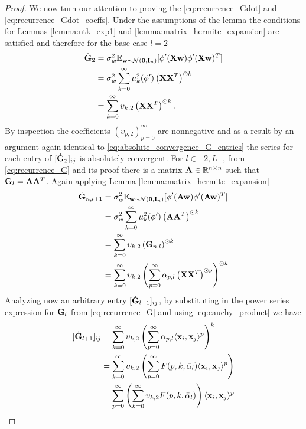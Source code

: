 \begin{proof}
    We now turn our attention to proving the \eqref{eq:recurrence_Gdot} and \eqref{eq:recurrence_Gdot_coeffs}.  Under the assumptions of the lemma the conditions for Lemmas \ref{lemma:ntk_exp1} and \ref{lemma:matrix_hermite_expansion} are satisfied and therefore for the base case $l=2$ 
    \[
    \begin{aligned}
        \dot{\mathbf{G}}_{2} &= \sigma_w^2 \mathbb{E}_{\mathbf w \sim \mathcal{N}(\textbf{0}, \textbf{I}_n)}[\phi'(\mathbf{X} \mathbf w) \phi'(\mathbf{X} \mathbf w)^T]\\
        &= \sigma_w^2 \sum_{k=0}^\infty \mu_k^2(\phi') \left(\mathbf{X} \mathbf{X}^T \right)^{\odot k}\\
        & = \sum_{k=0}^\infty \upsilon_{k,2} \left(\mathbf{X} \mathbf{X}^T \right)^{\odot k}. 
    \end{aligned}
    \]
    By inspection the coefficients $(\upsilon_{p,2})_{p=0}^{\infty}$ are nonnegative and as a result by an argument again identical to \eqref{eq:absolute_convergence_G_entries} the series for each entry of $[\dot{\mathbf{G}}_{2}]_{ij}$ is absolutely convergent. For $l \in [2,L]$, from \eqref{eq:recurrence_G} and its proof there is a matrix $\mathbf{A} \in \mathbb{R}^{n \times n}$ such that $\mathbf{G}_{l} = \mathbf{A} \mathbf{A}^T$. Again applying Lemma \ref{lemma:matrix_hermite_expansion}
    \[
    \begin{aligned}
    \dot{\mathbf{G}}_{n,l+1}
    & = \sigma_w^2 \mathbb{E}_{\mathbf w \sim \mathcal{N}(\textbf{0}, \textbf{I}_n)}[\phi'(\mathbf{A} \mathbf w) \phi'(\mathbf{A} \mathbf w)^T]\\
    & = \sigma_w^2 \sum_{k=0}^\infty \mu_k^2(\phi') \left(\mathbf{A} \mathbf{A}^T \right)^{\odot k}\\
    & = \sum_{k=0}^\infty \upsilon_{k,2}\left(\mathbf{G}_{n,l}\right)^{\odot k}\\
    & = \sum_{k=0}^\infty \upsilon_{k,2}\left(\sum_{p=0}^{\infty} \alpha_{p, l} \left( \mathbf{X} \mathbf{X}^T\right)^{\odot p}\right)^{\odot k}
    \end{aligned}
    \]
    Analyzing now an arbitrary entry $[\dot{\mathbf{G}}_{l+1}]_{ij}$, by substituting in the power series expression for $\mathbf{G}_{l}$ from \eqref{eq:recurrence_G} and using \eqref{eq:cauchy_product} we have
    \[
    \begin{aligned}
        [\dot{\mG}_{l+1}]_{ij} &= \sum_{k=0}^\infty \upsilon_{k,2} \left(\sum_{p=0}^{\infty} \alpha_{p, l}  \langle \vx_i, \vx_j \rangle^p \right)^k\\
        & = \sum_{k=0}^\infty \upsilon_{k,2} \left(\sum_{p=0}^{\infty} F(p,k,\bar{\alpha}_{l}) \langle \vx_i, \vx_j \rangle^p \right)\\
        & = \sum_{p=0}^{\infty} \left(\sum_{k=0}^\infty\upsilon_{k,2} F(p,k,\bar{\alpha}_{l})\right)\langle \vx_i, \vx_j \rangle^p\\

\end{aligned}\]
\end{proof}
